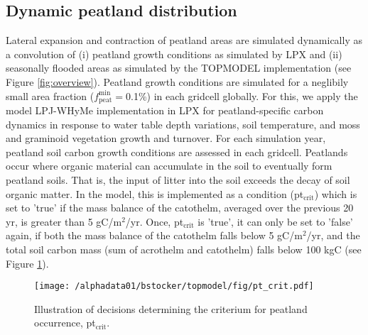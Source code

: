 \subsection{Dynamic peatland distribution}
Lateral expansion and contraction of peatland areas are simulated dynamically as a convolution of (i) peatland growth conditions as simulated by LPX and (ii) seasonally flooded areas as simulated by the TOPMODEL implementation (see Figure \ref{fig:overview}). Peatland growth conditions are simulated for a neglibily small area fraction ($f_{\text{peat}}^{\text{min}}=$0.1\%) in each gridcell globally. For this, we apply the model LPJ-WHyMe \citep{wania09gbcb} implementation in LPX \citep{spahni11bg, spahni12cpd} for peatland-specific carbon dynamics in response to water table depth variations, soil temperature, and moss and graminoid vegetation growth and turnover. For each simulation year, peatland soil carbon growth conditions are assessed in each gridcell. Peatlands occur where organic material can accumulate in the soil to eventually form peatland soils. That is, the input of litter into the soil exceeds the decay of soil organic matter. In the model, this is implemented as a condition (pt$_{\text{crit}}$) which is set to 'true' if the mass balance of the catothelm, averaged over the previous 20 yr, is greater than 5 gC/m$^2$/yr. Once, pt$_{\text{crit}}$ is 'true', it can only be set to 'false' again, if both the mass balance of the catothelm falls below 5 gC/m$^2$/yr, and the total soil carbon mass (sum of acrothelm and catothelm) falls below 100 kgC (see Figure \ref{fig:ptcrit}).\\
\begin{figure}[ht!]
\begin{center}
  \texttt{[image: /alphadata01/bstocker/topmodel/fig/pt\_crit.pdf]}
\end{center}
\caption[Illustration of decisions determining the criterium for peatland occurrence]{Illustration of decisions determining the criterium for peatland occurrence, pt$_{\text{crit}}$.}
\label{fig:ptcrit}
\end{figure}


